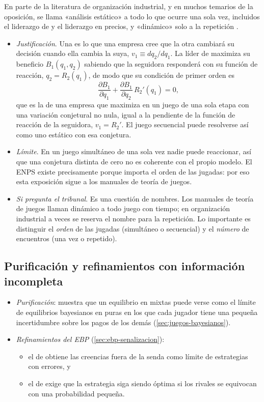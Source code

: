 \documentclass[11pt]{article}
\begin{document}
En parte de la literatura de organización industrial, y en muchos temarios de la oposición, se llama «análisis estático» a todo lo que ocurre una sola vez, incluidos el liderazgo de  y el liderazgo en precios, y «dinámico» solo a la repetición .
\begin{itemize}
\item \emph{Justificación}. Una  es lo que una empresa cree que la otra cambiará su decisión cuando ella cambia la suya, $v_1\equiv dq_2/dq_1$\nocite{Bowley1924Mathematical}. La líder de  maximiza su beneficio $B_1(q_1,q_2)$ sabiendo que la seguidora responderá con su función de reacción, $q_2=R_2(q_1)$, de modo que su condición de primer orden es
\[
\frac{\partial B_1}{\partial q_1}+\frac{\partial B_1}{\partial q_2}\,R_2'(q_1)=0,
\]
  que es la de una empresa que maximiza en un juego de una sola etapa con una variación conjetural no nula, igual a la pendiente de la función de reacción de la seguidora, $v_1=R_2'$. El juego secuencial puede resolverse así como uno estático con esa conjetura.
\item \emph{Límite}. En un juego simultáneo de una sola vez nadie puede reaccionar, así que una conjetura distinta de cero no es coherente con el propio modelo\nocite{Tirole1988Theory}. El ENPS existe precisamente porque importa el orden de las jugadas: por eso esta exposición sigue a los manuales de teoría de juegos.
\item \emph{Si pregunta el tribunal}. Es una cuestión de nombres. Los manuales de teoría de juegos llaman dinámico a todo juego con tiempo; en organización industrial a veces se reserva el nombre para la repetición. Lo importante es distinguir el \emph{orden} de las jugadas (simultáneo o secuencial) y el \emph{número} de encuentros (una vez o repetido).
\end{itemize}

\subsection*{Purificación y refinamientos con información incompleta}

\begin{itemize}
\item \emph{Purificación}: \textcite{Harsanyi1973Games} muestra que un equilibrio en mixtas puede verse como el límite de equilibrios bayesianos en puras en los que cada jugador tiene una pequeña incertidumbre sobre los pagos de los demás (\ref{sec:juegos-bayesianos}).
\item \emph{Refinamientos del EBP} (\ref{sec:ebp-senalizacion}):
  \begin{itemize}
  \item el  de \textcite{KrepsWilson1982Sequential} obtiene las creencias fuera de la senda como límite de estrategias con errores, y
  \item el  de \textcite{Selten1975Reexamination} exige que la estrategia siga siendo óptima si los rivales se equivocan con una probabilidad pequeña.
  \end{itemize}
\end{itemize}
\end{document}
